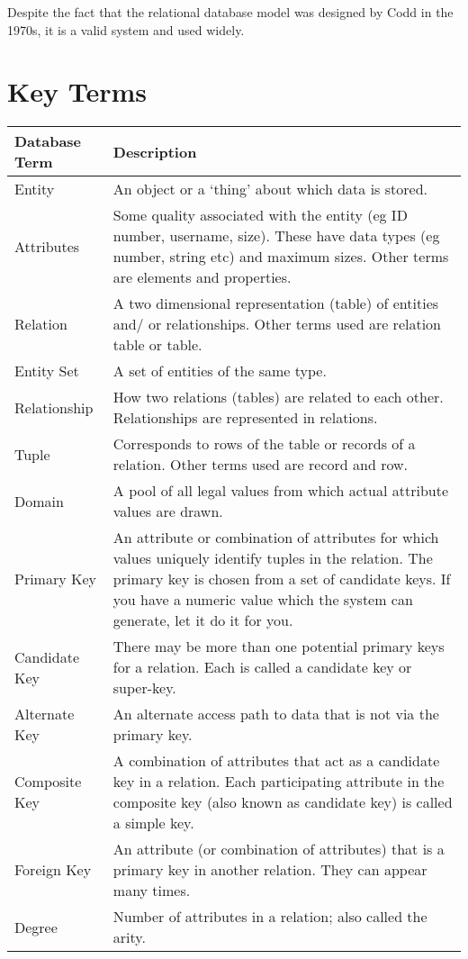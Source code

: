 
Despite the fact that the relational database model was designed by Codd in the 1970s, it is a valid system and used widely.

\section*{Key Terms}
\begin{table}[H]
    \centering
    \begin{tabularx}{0.8\textwidth}{l|X}
        Database Term & Description\\
        \hline
        \hline
        Entity & An object or a `thing' about which data is stored. \\
        Attributes & Some quality associated with the entity (eg ID number, username, size). These have data types (eg number, string etc) and maximum sizes. Other terms are elements and properties.\\
        Relation & A two dimensional representation (table) of entities and/ or relationships. Other terms used are relation table or table.\\
        Entity Set & A set of entities of the same type.\\
        Relationship & How two relations (tables) are related to each other. Relationships are represented in relations.\\
        Tuple & Corresponds to rows of the table or records of a relation. Other terms used are record and row.\\
        Domain & A pool of all legal values from which actual attribute values are drawn.\\
        Primary Key & An attribute or combination of attributes for which values uniquely identify tuples in the relation. The primary key is chosen from a set of candidate keys. If you have a numeric value which the system can generate, let it do it for you.\\
        Candidate Key & There may be more than one potential primary keys for a relation. Each is called a candidate key or super-key.\\
        Alternate Key & An alternate access path to data that is not via the primary key.\\
        Composite Key & A combination of attributes that act as a candidate key in a relation. Each participating attribute in the composite key (also known as candidate key) is called a simple key.\\
        Foreign Key & An attribute (or combination of attributes) that is a primary key in another relation. They can appear many times.\\
        Degree & Number of attributes in a relation; also called the arity.
    \end{tabularx}
\end{table}

